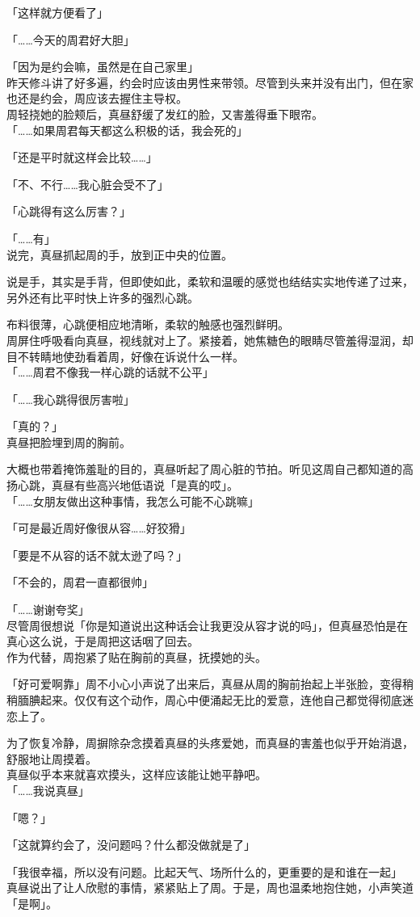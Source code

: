 「这样就方便看了」

「……今天的周君好大胆」

「因为是约会嘛，虽然是在自己家里」\\

昨天修斗讲了好多遍，约会时应该由男性来带领。尽管到头来并没有出门，但在家也还是约会，周应该去握住主导权。\\

周轻挠她的脸颊后，真昼舒缓了发红的脸，又害羞得垂下眼帘。\\

「……如果周君每天都这么积极的话，我会死的」

「还是平时就这样会比较……」

「不、不行……我心脏会受不了」

「心跳得有这么厉害？」

「……有」\\

说完，真昼抓起周的手，放到正中央的位置。

说是手，其实是手背，但即使如此，柔软和温暖的感觉也结结实实地传递了过来，另外还有比平时快上许多的强烈心跳。

布料很薄，心跳便相应地清晰，柔软的触感也强烈鲜明。\\

周屏住呼吸看向真昼，视线就对上了。紧接着，她焦糖色的眼睛尽管羞得湿润，却目不转睛地使劲看着周，好像在诉说什么一样。\\

「……周君不像我一样心跳的话就不公平」

「……我心跳得很厉害啦」

「真的？」\\

真昼把脸埋到周的胸前。

大概也带着掩饰羞耻的目的，真昼听起了周心脏的节拍。听见这周自己都知道的高扬心跳，真昼有些高兴地低语说「是真的哎」。\\

「……女朋友做出这种事情，我怎么可能不心跳嘛」

「可是最近周好像很从容……好狡猾」

「要是不从容的话不就太逊了吗？」

「不会的，周君一直都很帅」

「……谢谢夸奖」\\

尽管周很想说「你是知道说出这种话会让我更没从容才说的吗」，但真昼恐怕是在真心这么说，于是周把这话咽了回去。\\

作为代替，周抱紧了贴在胸前的真昼，抚摸她的头。

「好可爱啊靠」周不小心小声说了出来后，真昼从周的胸前抬起上半张脸，变得稍稍腼腆起来。仅仅有这个动作，周心中便涌起无比的爱意，连他自己都觉得彻底迷恋上了。

为了恢复冷静，周摒除杂念摸着真昼的头疼爱她，而真昼的害羞也似乎开始消退，舒服地让周摸着。\\

真昼似乎本来就喜欢摸头，这样应该能让她平静吧。\\

「……我说真昼」

「嗯？」

「这就算约会了，没问题吗？什么都没做就是了」

「我很幸福，所以没有问题。比起天气、场所什么的，更重要的是和谁在一起」\\

真昼说出了让人欣慰的事情，紧紧贴上了周。于是，周也温柔地抱住她，小声笑道「是啊」。
